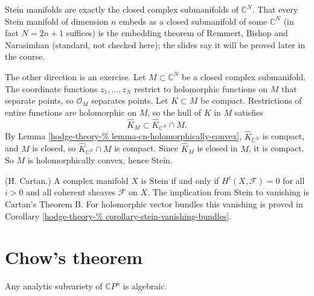 \begin{remark}
\label{remark-stein-embedding}
Stein manifolds are exactly the closed
complex submanifolds of $\mathbb{C}^N$. That
every Stein manifold of dimension $n$ embeds
as a closed submanifold of some
$\mathbb{C}^N$ (in fact $N=2n+1$ suffices) is
the embedding theorem of Remmert, Bishop and
Narasimhan (standard, not checked here); the
slides say it will be proved later in the
course.

The other direction is an exercise. Let
$M\subset\mathbb{C}^N$ be a closed complex
submanifold. The coordinate functions
$z_1,\dots,z_N$ restrict to holomorphic
functions on $M$ that separate points, so
$\mathcal{O}_M$ separates points. Let
$K\subset M$ be compact. Restrictions of
entire functions are holomorphic on $M$, so
the hull of $K$ in $M$ satisfies
$$
\widehat K_M\subset\widehat K_{\mathbb{C}^N}
\cap M .
$$
By Lemma
\ref{hodge-theory-%
lemma-cn-holomorphically-convex},
$\widehat K_{\mathbb{C}^N}$ is compact, and
$M$ is closed, so $\widehat
K_{\mathbb{C}^N}\cap M$ is compact. Since
$\widehat K_M$ is closed in $M$, it is
compact. So $M$ is holomorphically convex,
hence Stein.
\end{remark}

\begin{remark}
\label{remark-stein-cartan}
(H. Cartan.) A complex manifold $X$ is Stein
if and only if $H^i(X,\mathcal{F})=0$ for all
$i>0$ and all coherent sheaves $\mathcal{F}$
on $X$. The implication from Stein to
vanishing is Cartan's Theorem B.
For holomorphic vector bundles this
vanishing is proved in Corollary
\ref{hodge-theory-%
corollary-stein-vanishing-bundles}.
\end{remark}


\section{Chow's theorem}
\label{section-chow-theorem}

\begin{theorem}[Chow]
\label{theorem-chow}
Any analytic subvariety of $\mathbb{C}P^{n}$
is algebraic.
\end{theorem}

